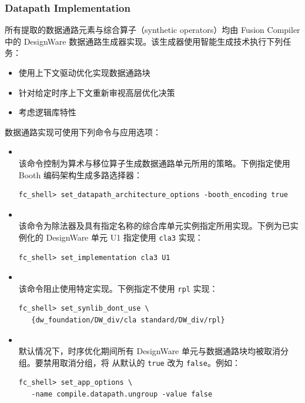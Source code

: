 \subsubsection*{Datapath Implementation}

所有提取的数据通路元素与综合算子（synthetic operators）均由 Fusion Compiler 中的 DesignWare 数据通路生成器实现。该生成器使用智能生成技术执行下列任务：
\begin{itemize}
  \item 使用上下文驱动优化实现数据通路块
  \item 针对给定时序上下文重新审视高层优化决策
  \item 考虑逻辑库特性
\end{itemize}

数据通路实现可使用下列命令与应用选项：
\begin{itemize}
  \item {}\\
    该命令控制为算术与移位算子生成数据通路单元所用的策略。下例指定使用 Booth 编码架构生成多路选择器：
\begin{lstlisting}
fc_shell> set_datapath_architecture_options -booth_encoding true
\end{lstlisting}
  \item {}\\
    该命令为除法器及具有指定名称的综合库单元实例指定所用实现。下例为已实例化的 DesignWare 单元 U1 指定使用 \texttt{cla3} 实现：
\begin{lstlisting}
fc_shell> set_implementation cla3 U1
\end{lstlisting}
  \item {}\\
    该命令阻止使用特定实现。下例指定不使用 \texttt{rpl} 实现：
\begin{lstlisting}
fc_shell> set_synlib_dont_use \
   {dw_foundation/DW_div/cla standard/DW_div/rpl}
\end{lstlisting}
  \item {}\\
    默认情况下，时序优化期间所有 DesignWare 单元与数据通路块均被取消分组。要禁用取消分组，将  从默认的 \texttt{true} 改为 \texttt{false}。例如：
\begin{lstlisting}
fc_shell> set_app_options \
   -name compile.datapath.ungroup -value false
\end{lstlisting}
\end{itemize}

